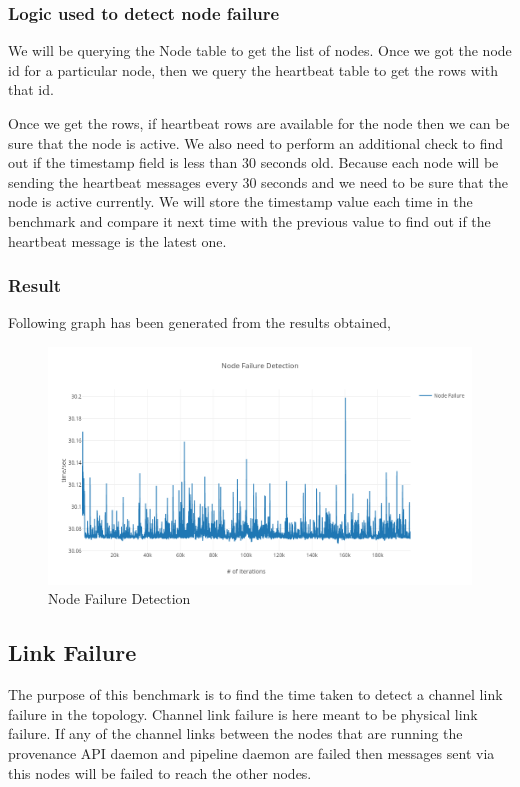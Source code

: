 \subsubsection{Logic used to detect node failure}

We will be querying the Node table to get the list of nodes. Once we got the node id for a particular node, then we query the heartbeat table to get the rows with that id.

Once we get the rows, if heartbeat rows are available for the node then we can be sure that the node is active. We also need to perform an additional check to find out if the timestamp field is less than 30 seconds old. Because each node will be sending the heartbeat messages every 30 seconds and we need to be sure that the node is active currently. We will store the timestamp value each time in the benchmark and compare it next time with the previous value to find out if the heartbeat message is the latest one.

\subsubsection{Result}

Following graph has been generated from the results obtained,

\begin{figure}[H]
	\center
	\includegraphics[width=1\textwidth]{figures/benchmark_node.png}
	\caption{Node Failure Detection}
	\label{fig:benchmark_node}
\end{figure}

\subsection{Link Failure}

The purpose of this benchmark is to find the time taken to detect a channel link failure in the topology. Channel link failure is here meant to be physical link failure. If any of the channel links between the nodes that are running the provenance API daemon and pipeline daemon are failed then messages sent via this nodes will be failed to reach the other nodes.

